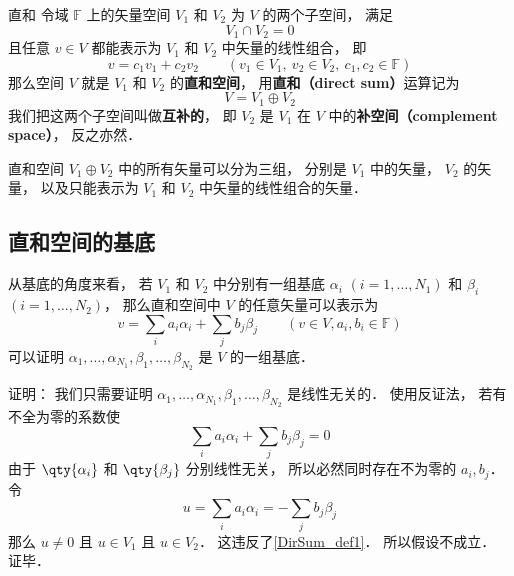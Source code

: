 
\begin{definition}{直和}\label{DirSum_def1}
令域 $\mathbb F$ 上的矢量空间 $V_1$ 和 $V_2$ 为 $V$ 的两个子空间， 满足
\begin{equation}
V_1 \cap V_2 = \qty{0}
\end{equation}
且任意 ${v} \in V$ 都能表示为 $V_1$ 和 $V_2$ 中矢量的线性组合， 即
\begin{equation}
{v} = c_1 {v_1} + c_2 {v_2}
\qquad
({v_1} \in V_1,\ {v_2} \in V_2,\ c_1, c_2 \in \mathbb F)
\end{equation}
那么空间 $V$ 就是 $V_1$ 和 $V_2$ 的\textbf{直和空间}， 用\textbf{直和（direct sum）}运算记为
\begin{equation}
V = V_1 \oplus V_2
\end{equation}
我们把这两个子空间叫做\textbf{互补的}， 即 $V_2$ 是 $V_1$ 在 $V$ 中的\textbf{补空间（complement space）}， 反之亦然．
\end{definition}

直和空间 $V_1 \oplus V_2$ 中的所有矢量可以分为三组， 分别是 $V_1$ 中的矢量， $V_2$ 的矢量， 以及只能表示为 $V_1$ 和 $V_2$ 中矢量的线性组合的矢量．

\subsection{直和空间的基底}
从基底的角度来看， 若 $V_1$ 和 $V_2$ 中分别有一组基底 ${\alpha_i}$ $(i = 1, \dots, N_1)$ 和 ${\beta_i}$ $(i = 1, \dots, N_2)$， 那么直和空间中 $V$ 的任意矢量可以表示为
\begin{equation}
{v} = \sum_i a_i {\alpha_i} + \sum_j b_j {\beta_j} \qquad (v\in V, a_i, b_i \in \mathbb F)
\end{equation}
可以证明 $\alpha_1, \dots, \alpha_{N_1}, \beta_1, \dots, \beta_{N_2}$ 是 $V$ 的一组基底．

证明： 我们只需要证明 $\alpha_1, \dots, \alpha_{N_1}, \beta_1, \dots, \beta_{N_2}$ 是线性无关的． 使用反证法， 若有不全为零的系数使
\begin{equation}
\sum_i a_i {\alpha_i} + \sum_j b_j {\beta_j} = 0
\end{equation}
由于 $\qty{\alpha_i}$ 和 $\qty{\beta_j}$ 分别线性无关， 所以必然同时存在不为零的 $a_i, b_j$． 令
\begin{equation}
u = \sum_i a_i {\alpha_i} = -\sum_j b_j {\beta_j}
\end{equation}
那么 $u \ne 0$ 且 $u \in V_1$ 且 $u \in V_2$． 这违反了\autoref{DirSum_def1}． 所以假设不成立． 证毕．

